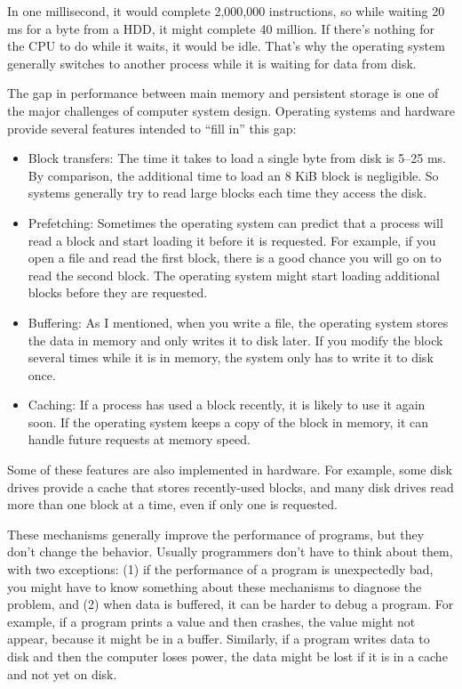 \documentclass[12pt]{book}
\begin{document}
{In one millisecond, it would complete 2,000,000 instructions,
so while waiting 20 ms for a byte from a HDD, it might complete
40 million.  If there's nothing for the CPU to do while it waits,
it would be idle.  That's why the operating system generally
switches to another process while it is waiting for data from disk.

The gap in performance between main memory and persistent storage is
one of the major challenges of computer system design.  Operating
systems and hardware provide several features intended to ``fill in''
this gap:

\begin{itemize}

\item Block transfers: The time it takes to load a single byte from
  disk is 5--25 ms.  By comparison, the additional time to load an 8
  KiB block is negligible.  So systems generally try to read large
  blocks each time they access the disk.

\item Prefetching: Sometimes the operating system can predict that a
  process will read a block and start loading it before it is
  requested.  For example, if you open a file and read the first
  block, there is a good chance you will go on to read the second
  block.  The operating system might start loading additional blocks
  before they are requested.

\item Buffering: As I mentioned, when you write a file, the operating
  system stores the data in memory and only writes it to disk later.
  If you modify the block several times while it is in memory, the
  system only has to write it to disk once.

\item Caching: If a process has used a block recently, it is likely to
  use it again soon.  If the operating system keeps a copy of the
  block in memory, it can handle future requests at memory speed.

\end{itemize}

Some of these features are also implemented in hardware.  For example,
some disk drives provide a cache that stores recently-used blocks,
and many disk drives read more than one block at a time, even if only
one is requested.

These mechanisms generally improve the performance of
programs, but they don't change the behavior.  Usually programmers
don't have to think about them, with two exceptions: (1) if the
performance of a program is unexpectedly bad, you might have to know
something about these mechanisms to diagnose the problem, and (2)
when data is buffered, it can be harder to debug a program.  For
example, if a program prints a value and then crashes, the value
might not appear, because it might be in a buffer.  Similarly, if a
program writes data to disk and then the computer loses power, the
data might be lost if it is in a cache and not yet on disk.


}
\end{document}
